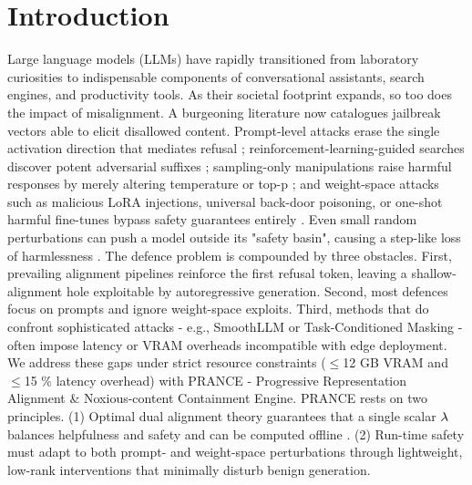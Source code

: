 \documentclass{article}
\begin{document}
\section{Introduction}
Large language models (LLMs) have rapidly transitioned from laboratory curiosities to indispensable components of conversational assistants, search engines, and productivity tools. As their societal footprint expands, so too does the impact of misalignment. A burgeoning literature now catalogues jailbreak vectors able to elicit disallowed content. Prompt-level attacks erase the single activation direction that mediates refusal \cite{arditi-2024-refusal}; reinforcement-learning-guided searches discover potent adversarial suffixes \cite{chen-2024-when}; sampling-only manipulations raise harmful responses by merely altering temperature or top-p \cite{huang-2023-catastrophic}; and weight-space attacks such as malicious LoRA injections, universal back-door poisoning, or one-shot harmful fine-tunes bypass safety guarantees entirely \cite{kurita-2020-weight,rando-2023-universal}. Even small random perturbations can push a model outside its "safety basin", causing a step-like loss of harmlessness \cite{peng-2024-navigating}.
The defence problem is compounded by three obstacles. First, prevailing alignment pipelines reinforce the first refusal token, leaving a shallow-alignment hole exploitable by autoregressive generation. Second, most defences focus on prompts and ignore weight-space exploits. Third, methods that do confront sophisticated attacks - e.g., SmoothLLM or Task-Conditioned Masking - often impose latency or VRAM overheads incompatible with edge deployment.
We address these gaps under strict resource constraints ($\leq$12 GB VRAM and $\leq$15 \% latency overhead) with PRANCE - Progressive Representation Alignment \& Noxious-content Containment Engine. PRANCE rests on two principles. (1) Optimal dual alignment theory guarantees that a single scalar $\lambda^{\*}$ balances helpfulness and safety and can be computed offline \cite{huang-2024-one}. (2) Run-time safety must adapt to both prompt- and weight-space perturbations through lightweight, low-rank interventions that minimally disturb benign generation.
\end{document}
